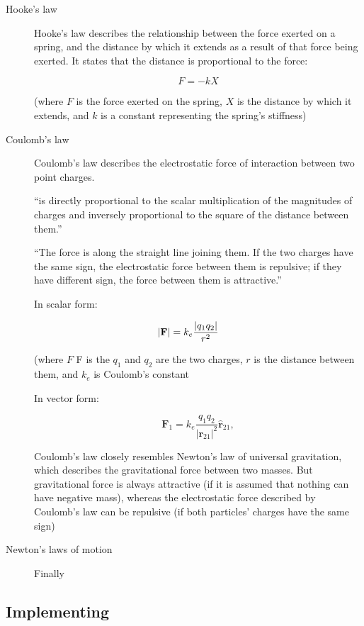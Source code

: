 \begin{description}

\item[Hooke's law] Hooke's law describes the relationship between the force exerted on a spring,
    and the distance by which it extends as a result of that force being exerted.
    It states that the distance is proportional to the force:

    $$
    F = -kX
    $$

    (where $F$ is the force exerted on the spring,
    $X$ is the distance by which it extends,
    and $k$ is a constant representing the spring's stiffness)

\item[Coulomb's law] Coulomb's law describes the electrostatic force of interaction between two point charges.

    ``is directly proportional to the scalar multiplication of the magnitudes of charges and inversely proportional to the square of the distance between them.''

    ``The force is along the straight line joining them.
    If the two charges have the same sign,
    the electrostatic force between them is repulsive;
    if they have different sign,
    the force between them is attractive.'' 

    In scalar form:

    $$
    |\mathbf F|=k_e{|q_1q_2|\over r^2}\qquad
    $$

    (where $F$ F is the $q_1$ and $q_2$ are the two charges, $r$ is the distance between them, and $k_e$ is Coulomb's constant 

    In vector form:

    $$
    \qquad\mathbf F_1=k_e\frac{q_1q_2}{{|\mathbf r_{21}|}^2} \mathbf{\hat{r}}_{21},\qquad
    $$

    Coulomb's law closely resembles Newton's law of universal gravitation, which describes the gravitational force between two masses.
    But gravitational force is always attractive (if it is assumed that nothing can have negative mass),
    whereas the electrostatic force described by Coulomb's law can be repulsive (if both particles' charges have the same sign)

\item[Newton's laws of motion] Finally

\end{description}


\subsection{Implementing }


